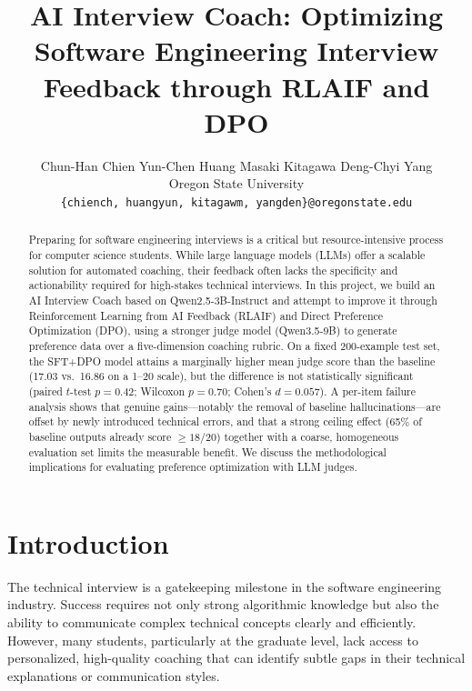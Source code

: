 \documentclass[10pt,twocolumn,letterpaper]{article}
\begin{document}
\title{AI Interview Coach: Optimizing Software Engineering Interview Feedback through RLAIF and DPO}

\author{Chun-Han Chien \hspace{15pt} Yun-Chen Huang \hspace{15pt} Masaki Kitagawa \hspace{15pt} Deng-Chyi Yang\\
Oregon State University\\
{\tt\small \{chiench, huangyun, kitagawm, yangden\}@oregonstate.edu}
}
\maketitle

\begin{abstract}
   Preparing for software engineering interviews is a critical but resource-intensive process for computer science students. While large language models (LLMs) offer a scalable solution for automated coaching, their feedback often lacks the specificity and actionability required for high-stakes technical interviews. In this project, we build an AI Interview Coach based on Qwen2.5-3B-Instruct and attempt to improve it through Reinforcement Learning from AI Feedback (RLAIF) and Direct Preference Optimization (DPO), using a stronger judge model (Qwen3.5-9B) to generate preference data over a five-dimension coaching rubric. On a fixed 200-example test set, the SFT+DPO model attains a marginally higher mean judge score than the baseline (17.03 vs.\ 16.86 on a 1--20 scale), but the difference is not statistically significant (paired $t$-test $p=0.42$; Wilcoxon $p=0.70$; Cohen's $d=0.057$). A per-item failure analysis shows that genuine gains---notably the removal of baseline hallucinations---are offset by newly introduced technical errors, and that a strong ceiling effect (65\% of baseline outputs already score $\geq 18/20$) together with a coarse, homogeneous evaluation set limits the measurable benefit. We discuss the methodological implications for evaluating preference optimization with LLM judges.
\end{abstract}

\section{Introduction}
\label{sec:intro}

The technical interview is a gatekeeping milestone in the software engineering industry. Success requires not only strong algorithmic knowledge but also the ability to communicate complex technical concepts clearly and efficiently. However, many students, particularly at the graduate level, lack access to personalized, high-quality coaching that can identify subtle gaps in their technical explanations or communication styles.
\end{document}
